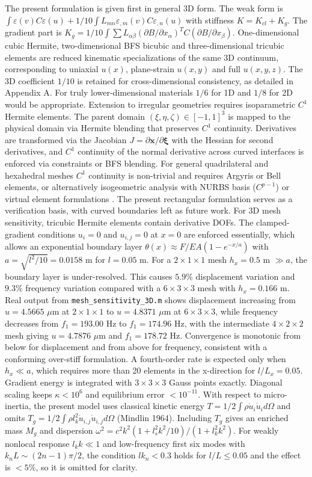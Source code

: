 \documentclass[final,3p,times,fleqn]{elsarticle}
\newcommand{\rev}[1]{\textcolor{revcolor}{#1}}
\begin{document}
\rev{The present formulation is given first in general 3D form. The weak form is $\int\varepsilon(v)C\varepsilon(u)+1/10\int L_{mn}\varepsilon_{,m}(v)C\varepsilon_{,n}(u)$ with stiffness $K=K_{cl}+K_g$. The gradient part is $K_g=1/10\int\sum L_{\alpha\beta}(\partial B/\partial x_\alpha)^T C (\partial B/\partial x_\beta)$. One-dimensional cubic Hermite, two-dimensional BFS bicubic and three-dimensional tricubic elements are reduced kinematic specializations of the same 3D continuum, corresponding to uniaxial $u(x)$, plane-strain $u(x,y)$ and full $u(x,y,z)$. The 3D coefficient $1/10$ is retained for cross-dimensional consistency, as detailed in Appendix A. For truly lower-dimensional materials $1/6$ for 1D and $1/8$ for 2D would be appropriate. Extension to irregular geometries requires isoparametric $C^1$ Hermite elements. The parent domain $(\xi,\eta,\zeta)\in[-1,1]^3$ is mapped to the physical domain via Hermite blending that preserves $C^1$ continuity. Derivatives are transformed via the Jacobian $J=\partial\mathbf{x}/\partial\boldsymbol{\xi}$ with the Hessian for second derivatives, and $C^1$ continuity of the normal derivative across curved interfaces is enforced via constraints or BFS blending. For general quadrilateral and hexahedral meshes $C^1$ continuity is non-trivial and requires Argyris or Bell elements, or alternatively isogeometric analysis with NURBS basis ($C^{p-1}$) or virtual element formulations \cite{WriggersHudobivnik2023}. The present rectangular formulation serves as a verification basis, with curved boundaries left as future work. For 3D mesh sensitivity, tricubic Hermite elements contain derivative DOFs. The clamped-gradient conditions $u_i=0$ and $u_{i,j}=0$ at $x=0$ are enforced essentially, which allows an exponential boundary layer $\theta(x)\approx F/EA(1-e^{-x/a})$ with $a=\sqrt{l^2/10}=0.0158$ m for $l=0.05$ m. For a $2\times1\times1$ mesh $h_x=0.5$ m $\gg a$, the boundary layer is under-resolved. This causes $5.9\%$ displacement variation and $9.3\%$ frequency variation compared with a $6\times3\times3$ mesh with $h_x=0.166$ m. Real output from \texttt{mesh\_sensitivity\_3D.m} shows displacement increasing from $u=4.5665$ $\mu$m at $2\times1\times1$ to $u=4.8371$ $\mu$m at $6\times3\times3$, while frequency decreases from $f_1=193.00$ Hz to $f_1=174.96$ Hz, with the intermediate $4\times2\times2$ mesh giving $u=4.7876$ $\mu$m and $f_1=178.72$ Hz. Convergence is monotonic from below for displacement and from above for frequency, consistent with a conforming over-stiff formulation. A fourth-order rate is expected only when $h_x \ll a$, which requires more than 20 elements in the x-direction for $l/L_x=0.05$. Gradient energy is integrated with $3\times3\times3$ Gauss points exactly. Diagonal scaling keeps $\kappa<10^6$ and equilibrium error $<10^{-11}$. With respect to micro-inertia, the present model uses classical kinetic energy $T=1/2\int\rho\dot{u}_i\dot{u}_i d\Omega$ and omits $T_g=1/2\int\rho l_k^2\dot{u}_{i,j}\dot{u}_{i,j}d\Omega$ (Mindlin 1964). Including $T_g$ gives an enriched mass $M_g$ and dispersion $\omega^2=c^2k^2(1+l_s^2k^2/10)/(1+l_k^2k^2)$. For weakly nonlocal response $l_kk\ll1$ and low-frequency first six modes with $k_nL\sim(2n-1)\pi/2$, the condition $lk_n<0.3$ holds for $l/L\le0.05$ and the effect is $<5\%$, so it is omitted for clarity.}
\end{document}
